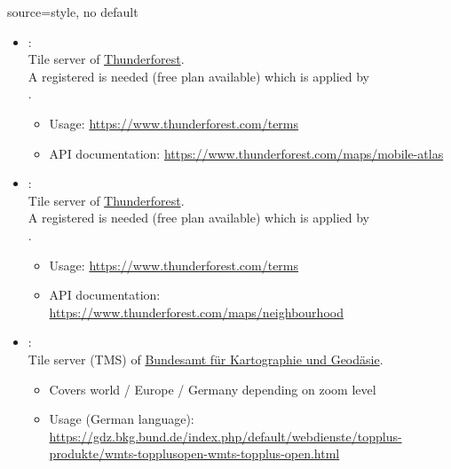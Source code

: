 \begin{docMrcKey}[supply]{source}{=}{style, no default}
\begin{itemize}
\clearpage
  \item{}:\\
    Tile server of \href{https://www.thunderforest.com}{Thunderforest}.\\
    A registered  is needed (free plan available)
    which is applied by\\
    .
    \begin{itemize}
    \item Usage: \url{https://www.thunderforest.com/terms}
    \item API documentation: \url{https://www.thunderforest.com/maps/mobile-atlas}
    \end{itemize}

  \item{}:\\
    Tile server of \href{https://www.thunderforest.com}{Thunderforest}.\\
    A registered  is needed (free plan available)
    which is applied by\\
    .
    \begin{itemize}
    \item Usage: \url{https://www.thunderforest.com/terms}
    \item API documentation: \url{https://www.thunderforest.com/maps/neighbourhood}
    \end{itemize}

\clearpage
  \item{}:\\
    Tile server (TMS) of \href{http://www.bkg.bund.de}{Bundesamt f\"{u}r Kartographie und Geod\"{a}sie}.
    \begin{itemize}
    \item Covers world / Europe / Germany depending on zoom level
    \item Usage (German language): \url{https://gdz.bkg.bund.de/index.php/default/webdienste/topplus-produkte/wmts-topplusopen-wmts-topplus-open.html}
    \end{itemize}


\end{itemize}
\end{docMrcKey}
